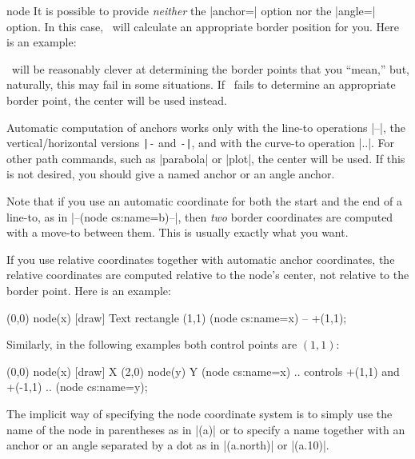 \begin{coordinatesystem}{node}
  It is possible to provide \emph{neither} the |anchor=| option nor
  the |angle=| option. In this case, \tikzname\ will calculate an
  appropriate border position for you. Here is an example:

\begin{codeexample}[]
\end{codeexample}

  \tikzname\ will be reasonably clever at determining the border points that
  you ``mean,'' but, naturally, this may fail in some situations. If
  \tikzname\ fails to determine an appropriate border point, the center will
  be used instead.

  Automatic computation of anchors works only with the line-to operations
  |--|, the vertical/horizontal versions \verb!|-! and \verb!-|!, and
  with the curve-to operation |..|. For other path commands, such as
  |parabola| or |plot|, the center will be used. If this is not desired,
  you should give a named anchor or an angle anchor.

  Note that if you use an automatic coordinate for both the start and
  the end of a line-to, as in |--(node cs:name=b)--|, then \emph{two}
  border   coordinates are computed with a move-to between them. This
  is usually   exactly what you want.

  If you use relative coordinates together with automatic anchor
  coordinates, the relative coordinates are computed relative to
  the node's center, not relative to the border point. Here is an
  example:

\begin{codeexample}[]
\tikz \draw (0,0) node(x) [draw] {Text}
            rectangle (1,1)
            (node cs:name=x) -- +(1,1);
\end{codeexample}

Similarly, in the following examples both control points are $(1,1)$:

\begin{codeexample}[]
\tikz \draw (0,0) node(x) [draw] {X}
            (2,0) node(y) {Y}
            (node cs:name=x) .. controls +(1,1) and +(-1,1) ..
            (node cs:name=y);
\end{codeexample}

  The implicit way of specifying the node coordinate system is to
  simply use the name of the node in parentheses as in |(a)| or to
  specify a name together with an anchor or an angle separated by a
  dot as in |(a.north)| or |(a.10)|.


\end{coordinatesystem}
